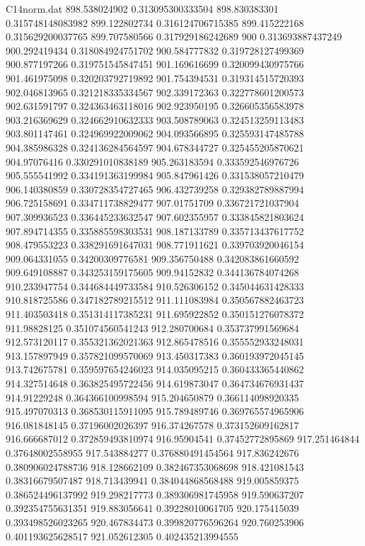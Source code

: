 \begin{filecontents}{C14norm.dat}
898.538024902			0.313095300333504
898.830383301			0.315748148083982
899.122802734			0.316124706715385
899.415222168			0.315629200037765
899.707580566			0.317929186242689
900			0.313693887437249
900.292419434			0.318084924751702
900.584777832			0.319728127499369
900.877197266			0.319751545847451
901.169616699			0.320099430975766
901.461975098			0.320203792719892
901.754394531			0.319314515720393
902.046813965			0.321218335334567
902.339172363			0.322778601200573
902.631591797			0.324363463118016
902.923950195			0.326605356583978
903.216369629			0.324662910632333
903.508789063			0.324513259113483
903.801147461			0.324969922009062
904.093566895			0.325593147485788
904.385986328			0.324136284564597
904.678344727			0.325455205870621
904.97076416			0.330291010838189
905.263183594			0.333592546976726
905.555541992			0.334191363199984
905.847961426			0.331538057210479
906.140380859			0.330728354727465
906.432739258			0.329382789887994
906.725158691			0.334711738829477
907.01751709			0.336721721037904
907.309936523			0.336445233632547
907.602355957			0.333845821803624
907.894714355			0.335885598303531
908.187133789			0.335713437617752
908.479553223			0.338291691647031
908.771911621			0.339703920046154
909.064331055			0.34200309776581
909.356750488			0.342083861660592
909.649108887			0.343253159175605
909.94152832			0.344136784074268
910.233947754			0.344684449733584
910.526306152			0.345044631428333
910.818725586			0.347182789215512
911.111083984			0.350567882463723
911.403503418			0.351314117385231
911.695922852			0.350151276078372
911.98828125			0.351074560541243
912.280700684			0.353737991569684
912.573120117			0.355321362021363
912.865478516			0.355552933248031
913.157897949			0.357821099570069
913.450317383			0.360193972045145
913.742675781			0.359597654246023
914.035095215			0.360433365440862
914.327514648			0.363825495722456
914.619873047			0.364734676931437
914.91229248			0.364366100998594
915.204650879			0.366114098920335
915.497070313			0.368530115911095
915.789489746			0.369765574965906
916.081848145			0.37196002026397
916.374267578			0.373152609162817
916.666687012			0.372859493810974
916.95904541			0.37452772895869
917.251464844			0.37648002558955
917.543884277			0.376880491454564
917.836242676			0.380906024788736
918.128662109			0.382467353068698
918.421081543			0.38316679507487
918.713439941			0.384044868568488
919.005859375			0.386524496137992
919.298217773			0.389306981745958
919.590637207			0.392354755631351
919.883056641			0.39228010061705
920.175415039			0.393498526023265
920.467834473			0.399820776596264
920.760253906			0.401193625628517
921.052612305			0.402435213994555

\end{filecontents}
